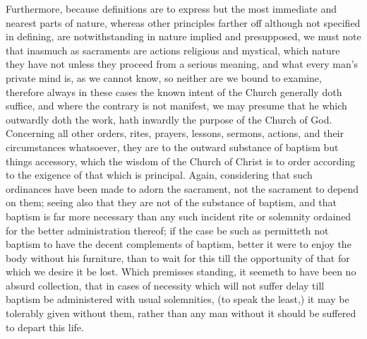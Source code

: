 Furthermore, because definitions are to express but the  most immediate and nearest parts of nature, whereas other principles farther off although not specified in defining, are notwithstanding in nature implied and presupposed, we must note that inasmuch as sacraments are actions religious and mystical, which nature they have not unless they proceed from a serious meaning, and what every man’s private mind is, as we cannot know, so neither are we bound to examine, therefore always in these cases the known intent of the Church generally doth suffice, and where the contrary is not manifest, we may presume that he which outwardly doth the work, hath inwardly the purpose of the Church of God.
Concerning all other orders, rites, prayers, lessons, sermons, actions, and their circumstances whatsoever, they are to the outward substance of baptism but things accessory, which the wisdom of the Church of Christ is to order according to  the exigence of that which is principal. Again, considering that such ordinances have been made to adorn the sacrament, not the sacrament to depend on them; seeing also that they are not of the substance of baptism, and that baptism is far more necessary than any such incident rite or solemnity ordained for the better administration thereof; if the case be such as permitteth not baptism to have the decent complements of baptism, better it were to enjoy the body without his furniture, than to wait for this till the opportunity of that for which we desire it be lost. Which premisses standing, it seemeth to have been no absurd collection, that in cases of necessity which will not suffer delay till baptism be administered with usual solemnities, (to speak the least,) it may be tolerably given without them, rather than any man without it should be suffered to depart this life.

